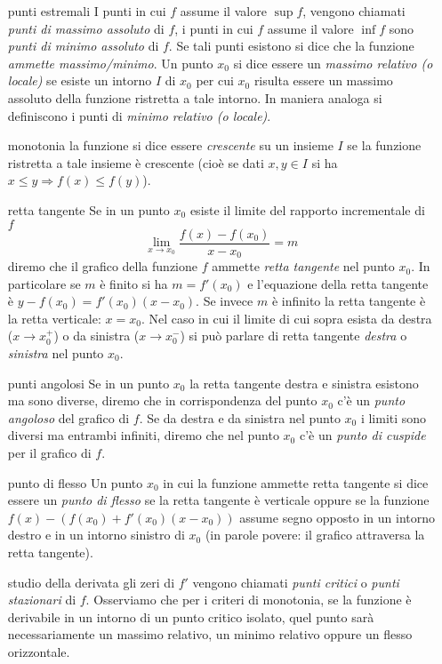 \documentclass[italian,a4paper]{article}
\begin{document}
\begin{enumerate}
  \item[punti estremali]
    I punti in cui $f$ assume il valore $\sup f$, vengono chiamati
    \emph{punti di massimo assoluto} di $f$, i punti in cui $f$ assume
    il valore $\inf f$ sono \emph{punti di minimo assoluto} di $f$. Se
    tali punti esistono si dice che la funzione \emph{ammette massimo/minimo}.
    Un punto $x_0$ si dice essere un \emph{massimo relativo (o
      locale)} se esiste un intorno $I$ di $x_0$ per cui $x_0$ risulta
    essere un massimo assoluto della funzione ristretta a tale
    intorno. In maniera analoga si definiscono i punti di \emph{minimo
      relativo (o locale)}.

  \item[monotonia]
    la funzione si dice essere \emph{crescente} su un insieme $I$ se
    la funzione ristretta a tale insieme è crescente (cioè se dati
    $x,y\in I$ si ha $x\le y \Rightarrow f(x)\le f(y)$).

  \item[retta tangente]
    Se in un punto $x_0$ esiste il limite del rapporto incrementale di
    $f$
    \[
    \lim_{x\to x_0} \frac{f(x)-f(x_0)}{x-x_0} = m
    \]
    diremo che il grafico della funzione $f$ ammette \emph{retta
      tangente} nel punto $x_0$. In particolare se $m$ è finito si ha
    $m=f'(x_0)$ e l'equazione della retta tangente è $y-f(x_0) =
    f'(x_0)(x-x_0)$. Se invece $m$ è infinito la retta tangente è
    la retta verticale: $x=x_0$. Nel caso in cui il limite di cui
    sopra esista da destra ($x\to x_0^+$) o da sinistra ($x\to x_0^-$)
    si può parlare di retta tangente \emph{destra} o \emph{sinistra}
    nel punto $x_0$.

  \item[punti angolosi]
    Se in un punto $x_0$ la retta tangente destra e sinistra esistono
    ma sono diverse, diremo che in corrispondenza del punto $x_0$
    c'è un \emph{punto
      angoloso} del grafico di $f$. Se da destra e da sinistra nel
    punto $x_0$ i limiti sono diversi ma entrambi infiniti, diremo che
    nel punto $x_0$ c'è un \emph{punto di cuspide} per il grafico di $f$.

  \item[punto di flesso]
    Un punto $x_0$ in cui la funzione ammette retta tangente si dice
    essere un \emph{punto di flesso} se la retta tangente è verticale
    oppure se la funzione $f(x) - (f(x_0) + f'(x_0)(x-x_0))$ assume
    segno opposto in un intorno destro e in un intorno sinistro di
    $x_0$ (in parole povere: il grafico attraversa la retta tangente).
    
  \item[studio della derivata]
    gli zeri di $f'$ vengono chiamati \emph{punti critici} o
    \emph{punti stazionari} di $f$. Osserviamo che per i criteri di
    monotonia, se la funzione è derivabile in un intorno di un punto
    critico isolato,
    quel punto sarà necessariamente un massimo relativo, un minimo
    relativo oppure un flesso orizzontale. 

\end{enumerate}
\end{document}
